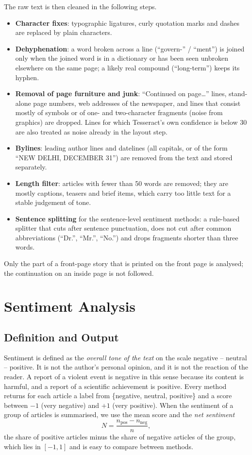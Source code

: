 The raw text is then cleaned in the following steps.
\begin{itemize}
\item \textbf{Character fixes}: typographic ligatures, curly quotation marks and dashes are replaced by plain characters.
\item \textbf{Dehyphenation}: a word broken across a line (``govern-'' / ``ment'') is joined only when the joined word is in a dictionary or has been seen unbroken elsewhere on the same page; a likely real compound (``long-term'') keeps its hyphen.
\item \textbf{Removal of page furniture and junk}: ``Continued on page\ldots'' lines, stand-alone page numbers, web addresses of the newspaper, and lines that consist mostly of symbols or of one- and two-character fragments (noise from graphics) are dropped. Lines for which Tesseract's own confidence is below 30 are also treated as noise already in the layout step.
\item \textbf{Bylines}: leading author lines and datelines (all capitals, or of the form ``NEW DELHI, DECEMBER 31'') are removed from the text and stored separately.
\item \textbf{Length filter}: articles with fewer than 50 words are removed; they are mostly captions, teasers and brief items, which carry too little text for a stable judgement of tone.
\item \textbf{Sentence splitting} for the sentence-level sentiment methods: a rule-based splitter that cuts after sentence punctuation, does not cut after common abbreviations (``Dr.'', ``Mr.'', ``No.'') and drops fragments shorter than three words.
\end{itemize}
Only the part of a front-page story that is printed on the front page is analysed; the continuation on an inside page is not followed.

\section{Sentiment Analysis}
\label{sec:sentiment}

\subsection{Definition and Output}
Sentiment is defined as the \emph{overall tone of the text} on the scale negative -- neutral -- positive. It is not the author's personal opinion, and it is not the reaction of the reader. A report of a violent event is negative in this sense because its content is harmful, and a report of a scientific achievement is positive. Every method returns for each article a label from \{negative, neutral, positive\} and a score between $-1$ (very negative) and $+1$ (very positive). When the sentiment of a group of articles is summarised, we use the mean score and the \emph{net sentiment}
\begin{equation}
N = \frac{n_{\mathrm{pos}} - n_{\mathrm{neg}}}{n},
\end{equation}
the share of positive articles minus the share of negative articles of the group, which lies in $[-1, 1]$ and is easy to compare between methods.

